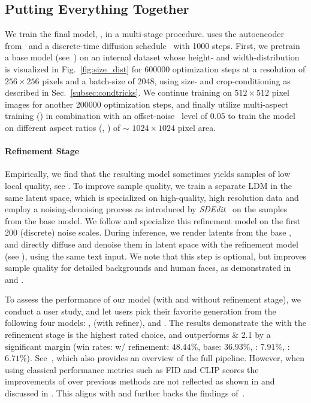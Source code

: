 \documentclass{article}
\begin{document}
\subsection{Putting Everything Together}
\label{subsec:putting}
We train the final model, \modelname, in a multi-stage procedure. \modelname uses the autoencoder from~ and a discrete-time diffusion schedule~\cite{ho2020denoising,sohl2015deep} with \num{1000} steps. 
First, we pretrain a base model (see~) on an internal dataset whose height- and width-distribution is visualized in Fig.~\ref{fig:size_dist} for \num{600000} optimization steps at a resolution of $256\times 256$ pixels and a batch-size of \num{2048}, using size- and crop-conditioning as described in Sec.~\ref{subsec:condtricks}. 
We continue training on $512 \times 512$ pixel images for another \num{200000} optimization steps, and finally utilize multi-aspect training () in combination with an offset-noise~\cite{guttenberg2023diffusion, lin2023common} level of \num{0.05} to train the model on different aspect ratios (, ) of $\sim$ $1024 \times 1024$ pixel area.

%
%
%
%
%
%


\paragraph{Refinement Stage}
Empirically, we find that the resulting model sometimes yields samples of low local quality, see . 
To improve sample quality, we train a separate LDM in the same latent space, which is specialized on high-quality, high resolution data and employ a noising-denoising process as introduced by \emph{SDEdit}~\cite{meng2021sdedit} on the samples from the base model. We follow \cite{balaji2022ediffi} and specialize this refinement model on the first 200 (discrete) noise scales.
During inference, we render latents from the base \modelname, and directly diffuse and denoise them in latent space with the refinement model (see ), using the same text input. We note that this step is optional, but improves sample quality for detailed backgrounds and human faces, as demonstrated in  and .

To assess the performance of our model (with and without refinement stage), we conduct a user study, and let users pick their favorite generation from the following four models: \modelname, \modelname (with refiner),  and . The results demonstrate the \modelname with the refinement stage is the highest rated choice, and outperforms  \& 2.1 by a significant margin (win rates: \modelname w/ refinement: $48.44\%$, \modelname base: $36.93\%$, : $7.91\%$, : $6.71\%$). See~, which also provides an overview of the full pipeline.
However, when using classical performance metrics such as FID and CLIP scores the improvements of \modelname over previous methods are not reflected as shown in  and discussed in . This aligns with and further backs the findings of~\citet{kirstain2023pick}.
\end{document}
